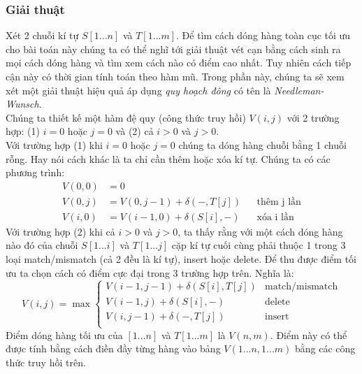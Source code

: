 \subsubsection{Giải thuật}
Xét 2 chuỗi kí tự $S[1...n]$ và $T[1...m]$. Để tìm cách dóng hàng toàn cục tối ưu cho 
bài toán này chúng ta có thể nghĩ tới giải thuật vét cạn bằng cách sinh ra mọi cách 
dóng hàng và tìm xem cách nào có điểm cao nhất. Tuy nhiên cách tiếp cận này có thời
gian tính toán theo hàm mũ. Trong phần này, chúng ta sẽ xem xét một giải thuật hiệu quả
áp dụng \textit{quy hoạch đông} có tên là \textit{Needleman-Wunsch}. \\
Chúng ta thiết kế một hàm đệ quy (công thức truy hồi) $V(i,j)$ với 2 trường hợp: (1) $i = 0$ 
hoặc $j = 0$ và (2) cả $i > 0$ và $j > 0$. \\
Với trường hợp (1) khi $i = 0$ hoặc $j = 0$ chúng ta dóng hàng chuỗi bằng 1 chuỗi rỗng.
Hay nói cách khác là ta chỉ cần thêm hoặc xóa kí tự. Chúng ta có các phương trình:
\begin{equation}
    \begin{aligned}
        V(0, 0) &= 0 & \\
        V(0, j) &= V(0, j - 1) + \delta(-, T[j]) && \text{thêm j lần} \\
        V(i, 0) &= V(i -1, 0) + \delta(S[i], -) && \text{xóa i lần} 
    \end{aligned}
\end{equation}
Với trường hợp (2) khi cả $i > 0$ và $j > 0$, ta thấy rằng với một cách dóng hàng nào đó
của chuỗi $S[1...i]$ và $T[1...j]$ cặp kí tự cuối cùng phải thuộc 1 trong 3 loại 
match/mismatch (cả 2 đều là kí tự), insert hoặc delete. Để thu được điểm tối ưu ta chọn 
cách có điểm cực đại trong 3 trường hợp trên. Nghĩa là:
\begin{equation}
    V(i, j) = \max 
    \begin{cases}
        V(i - 1, j - 1) + \delta(S[i], T[j]) & \text{match/mismatch} \\
        V(i - 1, j) + \delta(S[i], -) & \text{delete} \\
        V(i, j - 1) + \delta(-, T[j]) & \text{insert} \\
    \end{cases}
\end{equation}
Điểm dóng hàng tối ưu của $[1...n]$ và $T[1...m]$ là $V(n,m)$. Điểm này có thể được tính bằng
cách điền đầy từng hàng vào bảng $V(1...n, 1...m)$ bằng các công thức truy hồi trên.

